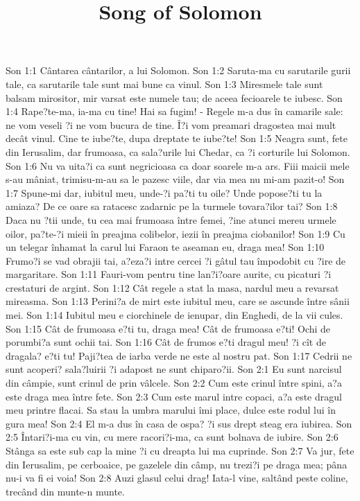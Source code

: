 

\title{Song of Solomon}

Son 1:1  Cântarea cântarilor, a lui Solomon.
Son 1:2  Saruta-ma cu sarutarile gurii tale, ca sarutarile tale sunt mai bune ca vinul.
Son 1:3  Miresmele tale sunt balsam mirositor, mir varsat este numele tau; de aceea fecioarele te iubesc.
Son 1:4  Rape?te-ma, ia-ma cu tine! Hai sa fugim! - Regele m-a dus în camarile sale: ne vom veseli ?i ne vom bucura de tine. Î?i vom preamari dragostea mai mult decât vinul. Cine te iube?te, dupa dreptate te iube?te!
Son 1:5  Neagra sunt, fete din Ierusalim, dar frumoasa, ca sala?urile lui Chedar, ca ?i corturile lui Solomon.
Son 1:6  Nu va uita?i ca sunt negricioasa ca doar soarele m-a ars. Fiii maicii mele s-au mâniat, trimisu-m-au sa le pazesc viile, dar via mea nu mi-am pazit-o!
Son 1:7  Spune-mi dar, iubitul meu, unde-?i pa?ti tu oile? Unde popose?ti tu la amiaza? De ce oare sa ratacesc zadarnic pe la turmele tovara?ilor tai?
Son 1:8  Daca nu ?tii unde, tu cea mai frumoasa între femei, ?ine atunci mereu urmele oilor, pa?te-?i mieii în preajma colibelor, iezii în preajma ciobanilor!
Son 1:9  Cu un telegar înhamat la carul lui Faraon te aseaman eu, draga mea!
Son 1:10  Frumo?i se vad obrajii tai, a?eza?i intre cercei ?i gâtul tau împodobit cu ?ire de margaritare.
Son 1:11  Fauri-vom pentru tine lan?i?oare aurite, cu picaturi ?i crestaturi de argint.
Son 1:12  Cât regele a stat la masa, nardul meu a revarsat mireasma.
Son 1:13  Perini?a de mirt este iubitul meu, care se ascunde între sânii mei.
Son 1:14  Iubitul meu e ciorchinele de ienupar, din Enghedi, de la vii cules.
Son 1:15  Cât de frumoasa e?ti tu, draga mea! Cât de frumoasa e?ti! Ochi de porumbi?a sunt ochii tai.
Son 1:16  Cât de frumos e?ti dragul meu! ?i cît de dragala? e?ti tu! Paji?tea de iarba verde ne este al nostru pat.
Son 1:17  Cedrii ne sunt acoperi? sala?luirii ?i adapost ne sunt chiparo?ii.
Son 2:1  Eu sunt narcisul din câmpie, sunt crinul de prin vâlcele.
Son 2:2  Cum este crinul între spini, a?a este draga mea între fete.
Son 2:3  Cum este marul intre copaci, a?a este dragul meu printre flacai. Sa stau la umbra marului îmi place, dulce este rodul lui în gura mea!
Son 2:4  El m-a dus în casa de ospa? ?i sus drept steag era iubirea.
Son 2:5  Întari?i-ma cu vin, cu mere racori?i-ma, ca sunt bolnava de iubire.
Son 2:6  Stânga sa este sub cap la mine ?i cu dreapta lui ma cuprinde.
Son 2:7  Va jur, fete din Ierusalim, pe cerboaice, pe gazelele din câmp, nu trezi?i pe draga mea; pâna nu-i va fi ei voia!
Son 2:8  Auzi glasul celui drag! Iata-l vine, saltând peste coline, trecând din munte-n munte.
